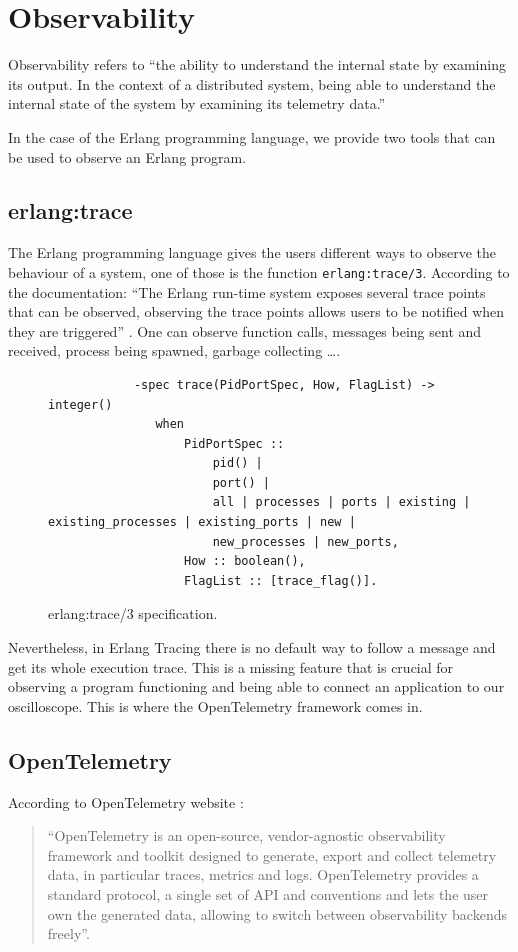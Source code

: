 \section{Observability}
        Observability refers to ``the ability to understand the internal state by examining its output. In the context of a distributed system, being able to understand the internal state of the system by examining its telemetry data.'' \cite{otel-o}

    In the case of the Erlang programming language, we provide two tools that can be used to observe an Erlang program.
    
    \subsection{erlang:trace}
        The Erlang programming language gives the users different ways to observe the behaviour of a system, one of those is the function \texttt{erlang:trace/3}. According to the documentation: ``The Erlang run-time system exposes several trace points that can be observed, observing the trace points allows users to be notified when they are triggered'' \cite{erl-t}. One can observe function calls, messages being sent and received, process being spawned, garbage collecting \dots. 
        \begin{figure}[!ht]
        \centering
        \begin{verbatim}
            -spec trace(PidPortSpec, How, FlagList) -> integer()
               when
                   PidPortSpec ::
                       pid() |
                       port() |
                       all | processes | ports | existing | existing_processes | existing_ports | new |
                       new_processes | new_ports,
                   How :: boolean(),
                   FlagList :: [trace_flag()].
        \end{verbatim}
        \caption{erlang:trace/3 specification.}
\end{figure}

    Nevertheless, in Erlang Tracing there is no default way to follow a message and get its whole execution trace. This is a missing feature that is crucial for observing a program functioning and being able to connect an application to our oscilloscope.  This is where the OpenTelemetry framework comes in.

\subsection{OpenTelemetry}
    According to OpenTelemetry website \cite{otel-o}: 
    \begin{quote}
        ``OpenTelemetry is an open-source, vendor-agnostic observability framework and toolkit designed to generate, export and collect telemetry data, in particular traces, metrics and logs. OpenTelemetry provides a standard protocol, a single set of API and conventions and lets the user own the generated data, allowing to switch between observability backends freely''.
    \end{quote}
   
